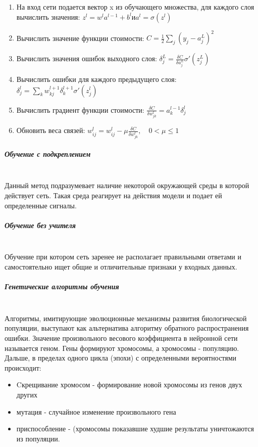 \begin{enumerate}
    \item На вход сети подается вектор x из обучающего множества, для каждого слоя вычислить значения: \hfill $z^l = w^la^{l-1}+b^l и a^l = \sigma(z^l)$
    \item Вычислить значение функции стоимости: \hfill $C = \frac{1}{2}\sum_j{(y_j-a_j^L)^2}$
    \item Вычислить значения ошибок выходного слоя: \hfill $\delta_j^L=\frac{\delta C}{\delta a_j^L}\sigma'(z_j^L)$
    \item Вычислить ошибки для каждого предыдущего слоя: \hfill $\delta_j^l=\sum_k{w_{kj}^{l+1} \delta_k^{l+1}\sigma'(z_j^l)}$
    \item Вычислить градиент функции стоимости: \hfill $\frac{\delta C}{\delta w_{jk}^l} = a_k^{l-1} \delta_j^l$ %
    \item Обновить веса связей: \hfill $w_{ij}^l=w_{ij}^l-\mu\frac{\delta C}{\delta w_{jk}^l},\hspace{1em} 0<\mu \leqslant 1$
\end{enumerate}

\subparagraph{Обучение с подкреплением}\mbox{} \\
 Данный метод подразумевает наличие некоторой окружающей среды в которой действует сеть. Такая среда реагирует на действия модели и подает ей определенные сигналы.  

\subparagraph{Обучение без учителя}\mbox{} \\
Обучение при котором сеть заренее не располагает правильными ответами и самостоятельно ищет общие и отличительные признаки у входных данных. 


\subparagraph{Генетические алгоритмы обучения}\mbox{} \\
 Алгоритмы, имитирующие эволюционные механизмы развития биологической популяции, выступают как альтернатива алгоритму обратного распространения ошибки. Значение произвольного весового коэффициента в нейронной сети называется геном. Гены формируют хромосомы, а хромосомы - популяцию. Дальше, в пределах одного цикла (эпохи) с определенными вероятностями происходит: 
 \begin{itemize}
     \item Cкрещивание хромосом - формирование новой хромосомы из генов двух других
     \item мутация - случайное изменение произвольного гена
     \item приспособление - (хромосомы показавшие худшие результаты уничтожаются из популяции.
 \end{itemize}

